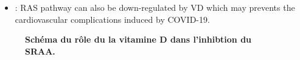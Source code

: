 \documentclass[
  a4paper,
  DIV=11,
  numbers=noendperiod,
  listof=totoc]{scrreprt}
\providecommand{\tightlist}{%
  \setlength{\itemsep}{0pt}\setlength{\parskip}{0pt}}\usepackage{longtable,booktabs,array}
\begin{document}
\autocite{Mahdavi.2020}

\begin{itemize}
\tightlist
\item
  \textcite{Shiravi.2022} : RAS pathway can also be down-regulated by VD
  which may prevents the cardiovascular complications induced by
  COVID-19.
\end{itemize}

\begin{figure}


\caption[Schéma du rôle du la vitamine D dans l'inhibtion du
SRAA.]{\label{fig-vd-ras}\textbf{Schéma du rôle du la vitamine D dans
l'inhibtion du SRAA.}}

\end{figure}%
\end{document}
